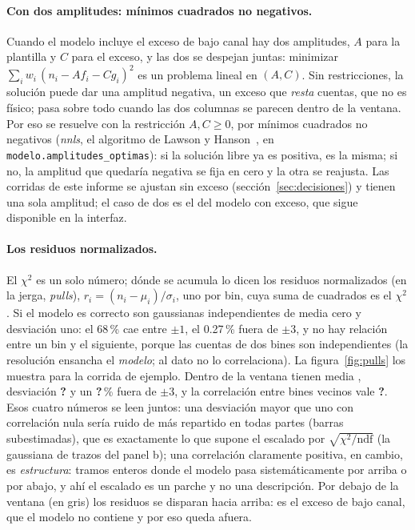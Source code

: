 \documentclass[11pt,a4paper]{article}
\newcommand{\faltaMacro}{\textbf{?}}
\providecommand{\EjPullSigma}{\faltaMacro}\providecommand{\EjPullFuera}{\faltaMacro}
\providecommand{\EjPullAutocorr}{\faltaMacro}\providecommand{\NdfMin}{\faltaMacro}
\begin{document}
\paragraph{Con dos amplitudes: mínimos cuadrados no negativos.} Cuando el
modelo incluye el exceso de bajo canal hay dos amplitudes, $A$ para la
plantilla y $C$ para el exceso, y las dos se despejan juntas: minimizar
$\sum_i w_i\,(n_i - A f_i - C g_i)^2$ es un problema lineal en $(A, C)$. Sin
restricciones, la solución puede dar una amplitud negativa, un exceso que
\emph{resta} cuentas, que no es físico; pasa sobre todo cuando las dos
columnas se parecen dentro de la ventana. Por eso se resuelve con la
restricción $A, C \geq 0$, por mínimos cuadrados no negativos (\emph{nnls},
el algoritmo de Lawson y Hanson~\cite{lawson1974}, en
\texttt{modelo.amplitudes\_optimas}): si la solución libre ya es positiva, es
la misma; si no, la amplitud que quedaría negativa se fija en cero y la otra
se reajusta. Las corridas de este informe se ajustan sin exceso
(sección~\ref{sec:decisiones}) y tienen una sola amplitud; el caso de dos es el
del modelo con exceso, que sigue disponible en la interfaz.

\paragraph{Los residuos normalizados.} El $\chi^2$ es un solo número; dónde
se acumula lo dicen los residuos normalizados (en la jerga, \emph{pulls}),
$r_i = (n_i - \mu_i)/\sigma_i$, uno por bin, cuya suma de cuadrados es el
$\chi^2$. Si el modelo es correcto son gaussianas independientes de media
cero y desviación uno: el 68\,\% cae entre $\pm1$, el 0.27\,\% fuera de
$\pm3$, y no hay relación entre un bin y el siguiente, porque las cuentas de
dos bines son independientes (la resolución ensancha el \emph{modelo}; al
dato no lo correlaciona). La figura~\ref{fig:pulls} los muestra para la
corrida de ejemplo. Dentro de la ventana tienen media \EjPullMedia{},
desviación \EjPullSigma{} y un \EjPullFuera\,\% fuera de $\pm3$, y la
correlación entre bines vecinos vale \EjPullAutocorr. Esos cuatro números se
leen juntos: una desviación mayor que uno con correlación nula sería ruido de
más repartido en todas partes (barras subestimadas), que es exactamente lo que
supone el escalado por $\sqrt{\chi^2/\text{ndf}}$ (la gaussiana de trazos del
panel b); una correlación claramente positiva, en cambio, es
\emph{estructura}: tramos enteros donde el modelo pasa sistemáticamente por
arriba o por abajo, y ahí el escalado es un parche y no una descripción. Por
debajo de la ventana (en gris) los residuos se disparan hacia arriba: es el
exceso de bajo canal, que el modelo no contiene y por eso queda afuera.
\end{document}
